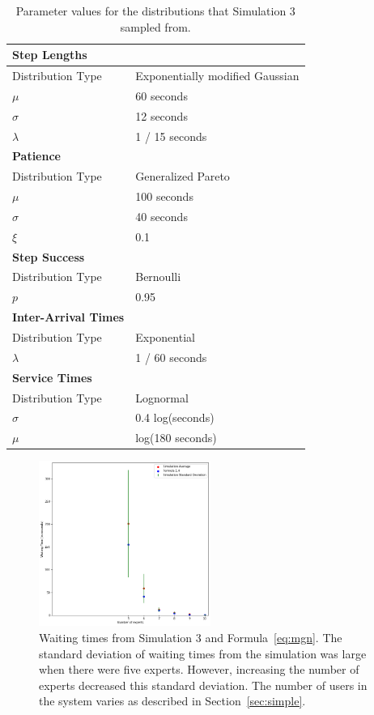 \begin{table}
  \begin{tabular}{|l|l|}
    \hline
    \textbf{Step Lengths} & \\
    \hline
    Distribution Type & Exponentially modified Gaussian\\
    \hline
    $\mu$ & 60 seconds\\
    \hline
    $\sigma$ & 12 seconds\\
    \hline
    $\lambda$ & 1 / 15 seconds\\
    \hline
    \hline
    \textbf{Patience} & \\
    \hline
    Distribution Type & Generalized Pareto\\
    \hline
    $\mu$ & 100 seconds\\
    \hline
    $\sigma$ & 40 seconds\\
    \hline
    $\xi$ & 0.1\\
    \hline
    \hline
    \textbf{Step Success} & \\
    \hline
    Distribution Type & Bernoulli\\
    \hline
    $p$ & 0.95\\
    \hline
    \hline
    \textbf{Inter-Arrival Times} & \\
    \hline
    Distribution Type & Exponential\\
    \hline
    $\lambda$ & 1 / 60 seconds\\
    \hline
    \hline
    \textbf{Service Times} & \\
    \hline
    Distribution Type & Lognormal\\
    \hline
    $\sigma$ & 0.4 log(seconds)\\
    \hline
    $\mu$ & log(180 seconds)\\
    \hline
  \end{tabular}
  \caption{Parameter values for the distributions that Simulation 3 sampled
    from.}\label{tab:sim3_params}
\end{table}

\begin{figure}[h]
  \includegraphics[width=0.5\textwidth]{figures/montecarlo/full_expected_sim.png}
  \caption{
    Waiting times from Simulation 3 and Formula~\ref{eq:mgn}.
    The standard deviation of waiting times from the simulation was large when
    there were five experts.
    However, increasing the number of experts decreased this standard deviation.
    The number of users in the system varies as described in
    Section~\ref{sec:simple}.
  }\label{fig:full_expected_sim}
\end{figure}

